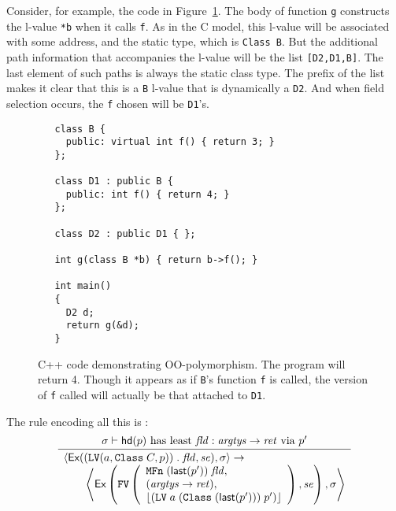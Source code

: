 \documentclass[11pt]{article}
\begin{document}
Consider, for example, the code in Figure~\ref{fig:oo-example}.  The
body of function \texttt{g} constructs the l-value \texttt{*b} when it
calls \texttt{f}.  As in the C model, this l-value will be associated
with some address, and the static type, which is \texttt{Class~B}.
But the additional path information that accompanies the l-value will
be the list \texttt{[D2,D1,B]}.  The last element of such paths is always
the static class type.  The prefix of the list makes it clear that
this is a \texttt{B} l-value that is dynamically a \texttt{D2}.  And
when field selection occurs, the \texttt{f} chosen will be
\texttt{D1}'s.

\begin{figure}[hbtp]
\begin{verbatim}
   class B {
     public: virtual int f() { return 3; }
   };

   class D1 : public B {
     public: int f() { return 4; }
   };

   class D2 : public D1 { };

   int g(class B *b) { return b->f(); }

   int main()
   {
     D2 d;
     return g(&d);
   }
\end{verbatim}
\caption{C++ code demonstrating OO-polymorphism.  The program will
  return 4. Though it appears as if \texttt{B}'s function \texttt{f}
  is called, the version of \texttt{f} called will actually be that
  attached to \texttt{D1}.}
\label{fig:oo-example}
\end{figure}

The rule encoding all this is :
\[
\infer{
  \begin{array}{l}
    \statebrack{\textsf{Ex}((\clvalue(a,\texttt{Class}\;C,p))\;\mathbf{.}\;
      \mathit{fld},\mathit{se}),\sigma} \rightarrow \\
    \qquad\left\langle\textsf{Ex}\left(\cfvalue\left(
        \begin{array}{l}
          \texttt{MFn}\;(\last(p'))\;\mathit{fld},\\
          (\funtype{\mathit{argtys}}{\mathit{ret}}),\\
          \SOME{(\clvalue\;a\;(\texttt{Class}\;(\last(p')))\;p')}
        \end{array}\right),
      \mathit{se}\right),\sigma\right\rangle
  \end{array}}{
  \sigma \vdash \hd(p) \textrm{ has least } \mathit{fld} :
  \funtype{\mathit{argtys}}{\mathit{ret}} \textrm{ via } p'}
\]
\end{document}

